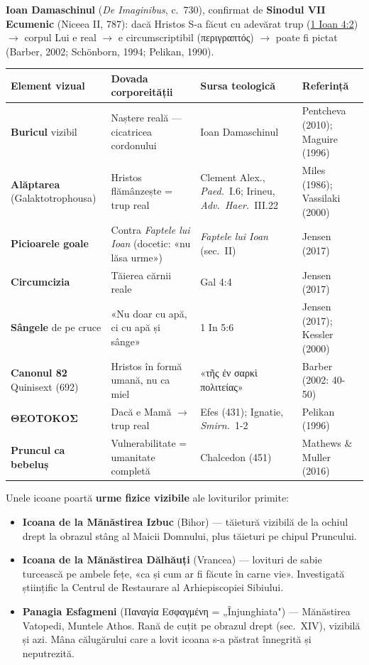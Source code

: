 \documentclass[12pt,a4paper,twoside,openany]{book}
\begin{document}
\textbf{Ioan Damaschinul} (\textit{De Imaginibus}, c.\ 730), confirmat de \textbf{Sinodul VII Ecumenic} (Niceea II, 787): dacă Hristos S-a făcut cu adevărat trup (\href{https://bibliaortodoxa.ro/carte.php?id=36\&cap=4\#2}{1 Ioan 4:2}) $\rightarrow$ corpul Lui e real $\rightarrow$ e circumscriptibil (περιγραπτός) $\rightarrow$ poate fi pictat (Barber, 2002; Schönborn, 1994; Pelikan, 1990).

\begin{center}
\footnotesize
\begin{tabular}{L{2.2cm}L{3.5cm}L{3cm}L{3.5cm}}
\toprule
{}
\textbf{Element vizual} & \textbf{Dovada corporeității} & \textbf{Sursa teologică} & \textbf{Referință} \\
\midrule
\textbf{Buricul} vizibil & Naștere reală --- cicatricea cordonului & Ioan Damaschinul & Pentcheva (2010); Maguire (1996) \\
\textbf{Alăptarea} (Galaktotrophousa) & Hristos flămânzește = trup real & Clement Alex., \textit{Paed.}\ I.6; Irineu, \textit{Adv.\ Haer.}\ III.22 & Miles (1986); Vassilaki (2000) \\
\textbf{Picioarele goale} & Contra \textit{Faptele lui Ioan} (docetic: «nu lăsa urme») & \textit{Faptele lui Ioan} (sec.\ II) & Jensen (2017) \\
\textbf{Circumcizia} & Tăierea cărnii reale & Gal 4:4 & Jensen (2017) \\
\textbf{Sângele} de pe cruce & «Nu doar cu apă, ci cu apă și sânge» & 1 In 5:6 & Jensen (2017); Kessler (2000) \\
\textbf{Canonul 82} Quinisext (692) & Hristos în formă umană, nu ca miel & «τῆς ἐν σαρκὶ πολιτείας» & Barber (2002: 40-50) \\
\textbf{ΘΕΟΤΟΚΟΣ} & Dacă e Mamă $\rightarrow$ trup real & Efes (431); Ignatie, \textit{Smirn.}\ 1-2 & Pelikan (1996) \\
\textbf{Pruncul ca bebeluș} & Vulnerabilitate = umanitate completă & Chalcedon (451) & Mathews \& Muller (2016) \\
\bottomrule
\end{tabular}
\end{center}
\normalsize


Unele icoane poartă \textbf{urme fizice vizibile} ale loviturilor primite:
\begin{itemize}
\item \textbf{Icoana de la Mănăstirea Izbuc} (Bihor) --- tăietură vizibilă de la ochiul drept la obrazul stâng al Maicii Domnului, plus tăieturi pe chipul Pruncului.
\item \textbf{Icoana de la Mănăstirea Dălhăuți} (Vrancea) --- lovituri de sabie turcească pe ambele fețe, «ca și cum ar fi făcute în carne vie». Investigată științific la Centrul de Restaurare al Arhiepiscopiei Sibiului.
\item \textbf{Panagia Esfagmeni} (Παναγία Εσφαγμένη = „Înjunghiata") --- Mănăstirea Vatopedi, Muntele Athos. Rană de cuțit pe obrazul drept (sec.\ XIV), vizibilă și azi. Mâna călugărului care a lovit icoana s-a păstrat înnegrită și neputrezită.
\end{itemize}
\end{document}
